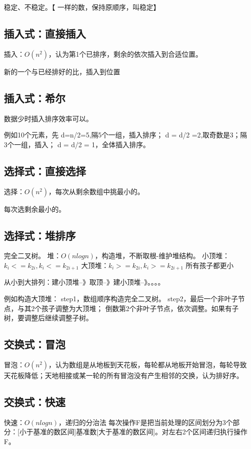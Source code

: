\documentclass[UTF8]{../computerUniverse}
\begin{document}
稳定、不稳定。【 一样的数，保持原顺序，叫稳定】



\subsection{插入式：直接插入}
插入：$O(n^2)$，认为第1个已排序，剩余的依次插入到合适位置。

新的一个与已经排好的比，插入到位置


\subsection{插入式：希尔}
数据少时插入排序效率可以。

例如10个元素，先
d=n/2=5,隔5个一组，插入排序；
d = d/2  =2,取奇数是3；隔3个一组，插入；
d = d/2 = 1，全体插入排序。


\subsection{选择式：直接选择}
选择：$O(n^2)$，每次从剩余数组中挑最小的。

每次选剩余最小的。


\subsection{选择式：堆排序}
完全二叉树。
堆：$O(nlogn)$，构造堆，不断取根-维护堆结构。
小顶堆：$k_i<=k_{2i}, k_i<=k_{2i+1}$
大顶堆：$k_i>=k_{2i}, k_i>=k_{2i+1}$ 所有孩子都更小

从小到大排列：建小顶堆--》取顶--》建小顶堆--》。。。。

例如构造大顶堆：
step1，数组顺序构造完全二叉树。
step2，最后一个非叶子节点，与其2个孩子调整为大顶堆；
       倒数第2个非叶子节点，依次调整。如果有子树，要调整后继续调整子树。
       

\subsection{交换式：冒泡}
冒泡：$O(n^2)$，认为数组是从地板到天花板，每轮都从地板开始冒泡，每轮导致天花板降低；天地相接或某一轮的所有冒泡没有产生相邻的交换，认为排好序。


\subsection{交换式：快速}    
快速：$O(nlogn)$，递归的分治法
每次操作F是把当前处理的区间划分为3个部分：[小于基准的数区间]基准数[大于基准的数区间]。对左右2个区间递归执行操作F。
\end{document}
